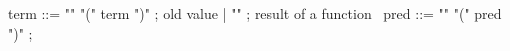 \begin{syntax}
  term ::= "\old" "(" term ")" ; old value
       | "\result" ; result of a function
       \
  pred ::= "\old" "(" pred ")" ; 
\end{syntax}

